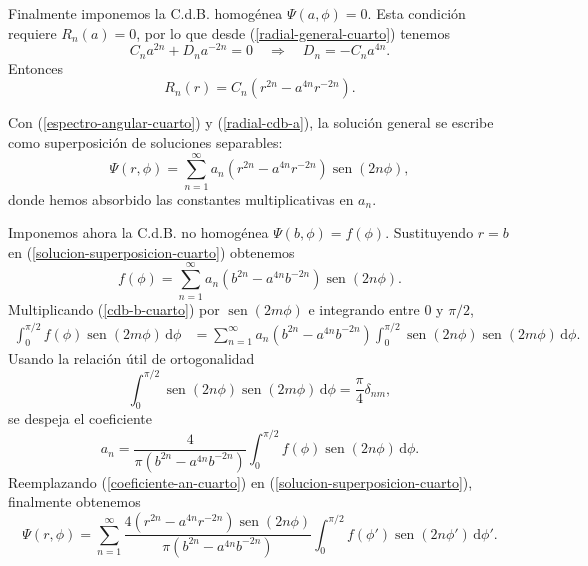 \documentclass[11pt]{article}
\newcommand{\dd}{\,\mathrm{d}}
\newcommand{\sen}{\operatorname{sen}}
\begin{document}
Finalmente imponemos la C.d.B. homogénea $\Psi(a,\phi)=0$. Esta condición requiere $R_n(a)=0$, por lo que desde (\ref{radial-general-cuarto}) tenemos
\begin{equation*}
C_na^{2n}+D_na^{-2n}=0
\quad\Rightarrow\quad
D_n=-C_na^{4n}.
\end{equation*}
Entonces
\begin{equation}
\label{radial-cdb-a}
R_n(r)=C_n\left(r^{2n}-a^{4n}r^{-2n}\right).
\end{equation}

Con (\ref{espectro-angular-cuarto}) y (\ref{radial-cdb-a}), la solución general se escribe como superposición de soluciones separables:
\begin{equation}
\label{solucion-superposicion-cuarto}
\Psi(r,\phi)=\sum_{n=1}^{\infty}a_n\left(r^{2n}-a^{4n}r^{-2n}\right)\sen(2n\phi),
\end{equation}
donde hemos absorbido las constantes multiplicativas en $a_n$.

Imponemos ahora la C.d.B. no homogénea $\Psi(b,\phi)=f(\phi)$. Sustituyendo $r=b$ en (\ref{solucion-superposicion-cuarto}) obtenemos
\begin{equation}
\label{cdb-b-cuarto}
f(\phi)=\sum_{n=1}^{\infty}a_n\left(b^{2n}-a^{4n}b^{-2n}\right)\sen(2n\phi).
\end{equation}
Multiplicando (\ref{cdb-b-cuarto}) por $\sen(2m\phi)$ e integrando entre $0$ y $\pi/2$,
\begin{align*}
\int_0^{\pi/2} f(\phi)\sen(2m\phi)\dd\phi
&=\sum_{n=1}^{\infty}a_n\left(b^{2n}-a^{4n}b^{-2n}\right)
\int_0^{\pi/2}\sen(2n\phi)\sen(2m\phi)\dd\phi.
\end{align*}
Usando la relación útil de ortogonalidad
\begin{equation*}
\int_0^{\pi/2}\sen(2n\phi)\sen(2m\phi)\dd\phi=\frac{\pi}{4}\delta_{nm},
\end{equation*}
se despeja el coeficiente
\begin{equation}
\label{coeficiente-an-cuarto}
a_n=\frac{4}{\pi\left(b^{2n}-a^{4n}b^{-2n}\right)}
\int_0^{\pi/2}f(\phi)\sen(2n\phi)\dd\phi.
\end{equation}
Reemplazando (\ref{coeficiente-an-cuarto}) en (\ref{solucion-superposicion-cuarto}), finalmente obtenemos
\begin{equation*}
\boxed{
\Psi(r,\phi)=\sum_{n=1}^{\infty}
\frac{4\left(r^{2n}-a^{4n}r^{-2n}\right)\sen(2n\phi)}{\pi\left(b^{2n}-a^{4n}b^{-2n}\right)}
\int_0^{\pi/2}f(\phi')\sen(2n\phi')\dd\phi'}.
\end{equation*}
\end{document}
